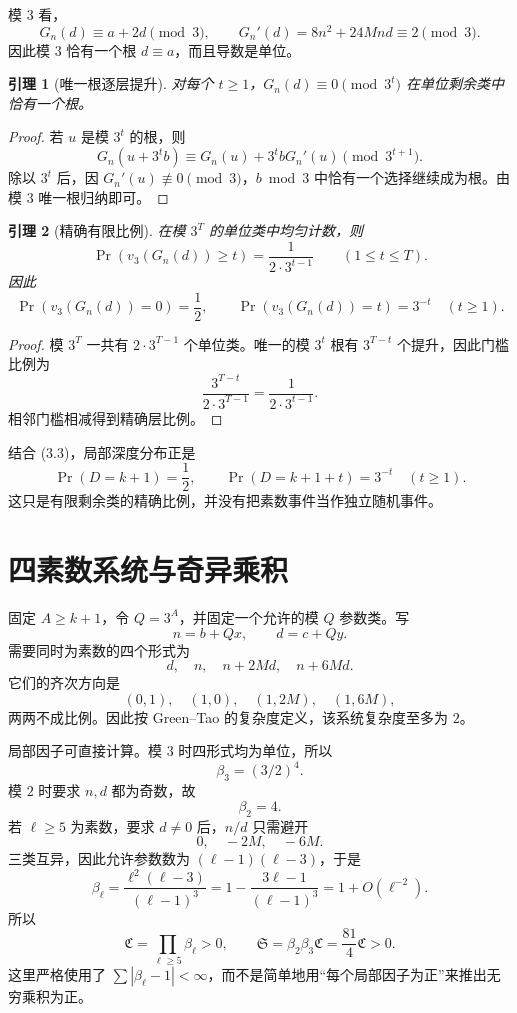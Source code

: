 \documentclass[11pt,a4paper]{ctexart}
\newtheorem{lemma}{引理}
\newcommand{\vthree}{v_3}
\newcommand{\Cfrak}{\mathfrak C}
\begin{document}
模 $3$ 看，
\[
G_n(d)\equiv a+2d\pmod3,
\qquad
G_n'(d)=8n^2+24Mnd\equiv2\pmod3. \tag{3.4}
\]
因此模 $3$ 恰有一个根 $d\equiv a$，而且导数是单位。

\begin{lemma}[唯一根逐层提升]
对每个 $t\ge1$，$G_n(d)\equiv0\pmod{3^t}$ 在单位剩余类中恰有一个根。
\end{lemma}
\begin{proof}
若 $u$ 是模 $3^t$ 的根，则
\[
G_n(u+3^tb)
\equiv G_n(u)+3^tbG_n'(u)\pmod{3^{t+1}}.
\]
除以 $3^t$ 后，因 $G_n'(u)\not\equiv0\pmod3$，$b\bmod3$ 中恰有一个选择继续成为根。由模 $3$ 唯一根归纳即可。
\end{proof}

\begin{lemma}[精确有限比例]
在模 $3^T$ 的单位类中均匀计数，则
\[
\Pr(\vthree(G_n(d))\ge t)=\frac{1}{2\cdot3^{t-1}}
\qquad(1\le t\le T).
\]
因此
\[
\Pr(\vthree(G_n(d))=0)=\frac12,
\qquad
\Pr(\vthree(G_n(d))=t)=3^{-t}\quad(t\ge1).
\]
\end{lemma}
\begin{proof}
模 $3^T$ 一共有 $2\cdot3^{T-1}$ 个单位类。唯一的模 $3^t$ 根有 $3^{T-t}$ 个提升，因此门槛比例为
\[
\frac{3^{T-t}}{2\cdot3^{T-1}}=\frac1{2\cdot3^{t-1}}.
\]
相邻门槛相减得到精确层比例。
\end{proof}

结合 (3.3)，局部深度分布正是
\[
\Pr(D=k+1)=\frac12,
\qquad
\Pr(D=k+1+t)=3^{-t}\quad(t\ge1). \tag{3.5}
\]
这只是有限剩余类的精确比例，并没有把素数事件当作独立随机事件。

\section{四素数系统与奇异乘积}
固定 $A\ge k+1$，令 $Q=3^A$，并固定一个允许的模 $Q$ 参数类。写
\[
n=b+Qx,\qquad d=c+Qy.
\]
需要同时为素数的四个形式为
\[
d,\quad n,\quad n+2Md,\quad n+6Md.
\]
它们的齐次方向是
\[
(0,1),\quad(1,0),\quad(1,2M),\quad(1,6M),
\]
两两不成比例。因此按 Green--Tao 的复杂度定义，该系统复杂度至多为 $2$。

局部因子可直接计算。模 $3$ 时四形式均为单位，所以
\[
\beta_3=(3/2)^4.
\]
模 $2$ 时要求 $n,d$ 都为奇数，故
\[
\beta_2=4.
\]
若 $\ell\ge5$ 为素数，要求 $d\ne0$ 后，$n/d$ 只需避开
\[
0,\quad-2M,\quad-6M.
\]
三类互异，因此允许参数数为 $(\ell-1)(\ell-3)$，于是
\[
\beta_\ell=
\frac{\ell^2(\ell-3)}{(\ell-1)^3}
=1-\frac{3\ell-1}{(\ell-1)^3}
=1+O(\ell^{-2}). \tag{4.1}
\]
所以
\[
\Cfrak=\prod_{\ell\ge5}\beta_\ell>0,
\qquad
\mathfrak S=\beta_2\beta_3\Cfrak=\frac{81}{4}\Cfrak>0. \tag{4.2}
\]
这里严格使用了 $\sum|\beta_\ell-1|<\infty$，而不是简单地用“每个局部因子为正”来推出无穷乘积为正。
\end{document}
